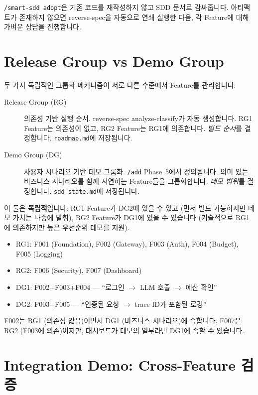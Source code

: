 \documentclass[11pt,a4paper,openright,twoside]{report}
\newcommand{\cmd}[1]{\texttt{/#1}}
\newcommand{\file}[1]{\texttt{#1}}
\begin{document}
\texttt{/smart-sdd adopt}은 기존 코드를 재작성하지 않고 SDD 문서로 감싸줍니다. 아티팩트가 존재하지 않으면 reverse-spec을 자동으로 연쇄 실행한 다음, 각 Feature에 대해 가벼운 상담을 진행합니다.

\section{Release Group vs Demo Group}

두 가지 독립적인 그룹화 메커니즘이 서로 다른 수준에서 Feature를 관리합니다:

\begin{description}
  \item[Release Group (RG)] 의존성 기반 실행 순서. reverse-spec analyze-classify가 자동 생성합니다. RG1 Feature는 의존성이 없고, RG2 Feature는 RG1에 의존합니다. \emph{빌드 순서}를 결정합니다. \file{roadmap.md}에 저장됩니다.
  \item[Demo Group (DG)] 사용자 시나리오 기반 데모 그룹화. \cmd{add} Phase~5에서 정의됩니다. 의미 있는 비즈니스 시나리오를 함께 시연하는 Feature들을 그룹화합니다. \emph{데모 범위}를 결정합니다. \file{sdd-state.md}에 저장됩니다.
\end{description}

이 둘은 \textbf{독립적}입니다: RG1 Feature가 DG2에 있을 수 있고 (먼저 빌드 가능하지만 데모 가치는 나중에 발휘), RG2 Feature가 DG1에 있을 수 있습니다 (기술적으로 RG1에 의존하지만 높은 우선순위 데모를 지원).

\begin{tipbox}
\begin{itemize}[nosep]
  \item RG1: F001 (Foundation), F002 (Gateway), F003 (Auth), F004 (Budget), F005 (Logging)
  \item RG2: F006 (Security), F007 (Dashboard)
  \item DG1: F002+F003+F004 --- ``로그인 $\rightarrow$ LLM 호출 $\rightarrow$ 예산 확인''
  \item DG2: F003+F005 --- ``인증된 요청 $\rightarrow$ trace ID가 포함된 로깅''
\end{itemize}
F002는 RG1 (의존성 없음)이면서 DG1 (비즈니스 시나리오)에 속합니다. F007은 RG2 (F003에 의존)이지만, 대시보드가 데모의 일부라면 DG1에 속할 수 있습니다.
\end{tipbox}

\section{Integration Demo: Cross-Feature 검증}
\end{document}
